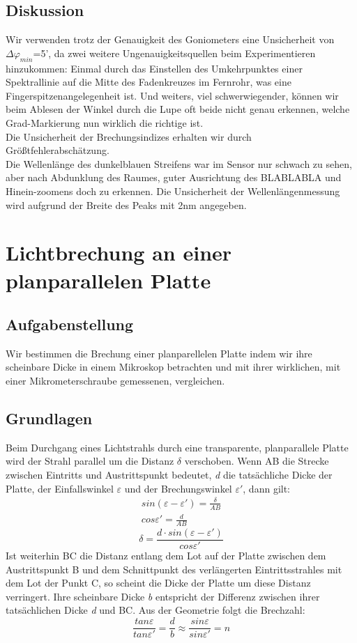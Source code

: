 \documentclass{article}
\begin{document}
\subsection{Diskussion}
Wir verwenden trotz der Genauigkeit des Goniometers eine Unsicherheit von $\Delta\varphi_{min}$=5', da zwei weitere Ungenauigkeitsquellen beim Experimentieren hinzukommen: Einmal durch das Einstellen des Umkehrpunktes einer Spektrallinie auf die Mitte des Fadenkreuzes im Fernrohr, was eine Fingerspitzenangelegenheit ist. Und weiters, viel schwerwiegender, können wir beim Ablesen der Winkel durch die Lupe oft beide nicht genau erkennen, welche Grad-Markierung nun wirklich die richtige ist.\\
Die Unsicherheit der Brechungsindizes erhalten wir durch Größtfehlerabschätzung.\\
Die Wellenlänge des dunkelblauen Streifens war im Sensor nur schwach zu sehen, aber nach Abdunklung des Raumes, guter Ausrichtung des BLABLABLA und Hinein-zoomens doch zu erkennen.
Die Unsicherheit der Wellenlängenmessung wird aufgrund der Breite des Peaks mit 2nm angegeben.


\section{Lichtbrechung an einer planparallelen Platte}

\subsection{Aufgabenstellung}
Wir bestimmen die Brechung einer planparellelen Platte indem wir ihre scheinbare Dicke in einem Mikroskop betrachten und mit ihrer wirklichen, mit einer Mikrometerschraube gemessenen, vergleichen.
\subsection{Grundlagen}
Beim Durchgang eines Lichtstrahls durch eine transparente, planparallele Platte wird der Strahl parallel um die Distanz $\delta$ verschoben. Wenn AB die Strecke zwischen Eintritts und Austrittspunkt bedeutet, \textit{d} die tatsächliche Dicke der Platte, der Einfallswinkel $\varepsilon$ und der Brechungswinkel $\varepsilon '$, dann gilt:
\begin{gather*}
sin(\varepsilon-\varepsilon ') = \frac{\delta}{AB} \\
cos \varepsilon ' = \frac{d}{AB}  
\end{gather*}
\begin{equation}
\label{distanzdelta}
\delta =\frac{d\cdot sin(\varepsilon - \varepsilon ')}{cos\varepsilon '}
\end{equation}
Ist weiterhin BC die Distanz entlang dem Lot auf der Platte zwischen dem Austrittspunkt B und dem Schnittpunkt des verlängerten Eintrittsstrahles mit dem Lot der Punkt C, so scheint die Dicke der Platte um diese Distanz verringert. Ihre scheinbare Dicke \textit{b} entspricht der Differenz zwischen ihrer tatsächlichen Dicke \textit{d} und BC. Aus der Geometrie folgt die Brechzahl: 
\begin{equation}
\label{brechzahlplatte}
\frac{tan\varepsilon}{tan\varepsilon '}=\frac{d}{b}\approx\frac{sin\varepsilon}{sin\varepsilon '} = n
\end{equation}
\end{document}
